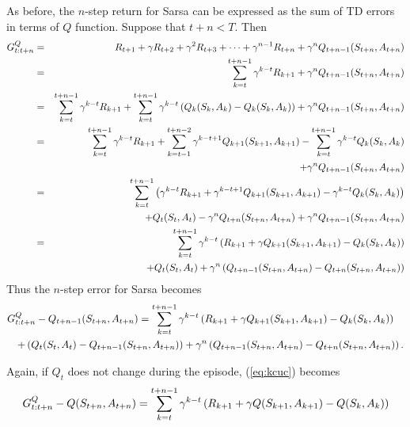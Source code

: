 As before, the $n$-step return for Sarsa can be expressed as the sum of TD errors in terms of $Q$ function.
Suppose that $t+n<T$. Then
\begin{eqnarray*}
G^{Q}_{{t}:{t+n}}
&=&
R_{t+1} + \gamma R_{t+2} + \gamma^2 R_{t+3} + \cdots + \gamma^{n-1} R_{t+n} + \gamma^n Q_{t+n-1}(S_{t+n}, A_{t+n})
\\
&=&
\sum_{k=t}^{t+n-1} \gamma^{k-t} R_{k+1} + \gamma^n Q_{t+n-1}(S_{t+n}, A_{t+n})
\\
&=&
\sum_{k=t}^{t+n-1} \gamma^{k-t} R_{k+1}
+ \sum_{k=t}^{t+n-1} \gamma^{k-t} \left( Q_{k}(S_{k},A_{k}) - Q_{k}(S_{k},A_{k}) \right)
+ \gamma^n Q_{t+n-1}(S_{t+n}, A_{t+n})
\\
&=&
\sum_{k=t}^{t+n-1} \gamma^{k-t} R_{k+1}
+ \sum_{k=t-1}^{t+n-2} \gamma^{k-t+1} Q_{k+1}(S_{k+1},A_{k+1})
- \sum_{k=t}^{t+n-1} \gamma^{k-t} Q_{k}(S_{k},A_{k})
\\
&&+ \gamma^n Q_{t+n-1}(S_{t+n}, A_{t+n})
\\
&=&
\sum_{k=t}^{t+n-1} \left( \gamma^{k-t} R_{k+1} + \gamma^{k-t+1} Q_{k+1}(S_{k+1},A_{k+1}) - \gamma^{k-t} Q_{k}(S_{k},A_{k}) \right)
\\
&&
+ Q_{t}(S_{t},A_{t}) - \gamma^{n}Q_{t+n}(S_{t+n}, A_{t+n}) + \gamma^n Q_{t+n-1}(S_{t+n}, A_{t+n})
\\
&=&
\sum_{k=t}^{t+n-1} \gamma^{k-t} \left( R_{k+1} + \gamma Q_{k+1}(S_{k+1},A_{k+1}) - Q_{k}(S_{k},A_{k}) \right)
\\
&&
+ Q_{t}(S_{t},A_{t}) + \gamma^n \left( Q_{t+n-1}(S_{t+n}, A_{t+n}) - Q_{t+n}(S_{t+n}, A_{t+n}) \right)
\end{eqnarray*}
Thus the $n$-step error for Sarsa becomes
\begin{eqnarray}
\nonumber
\lefteqn{
\nstepqreturn{t}{t+n} - Q_{t+n-1}(\state{t+n},\action{t+n})
= 
\sum_{k=t}^{t+n-1} \df^{k-t} \left( \reward{k+1} + \df Q_{k+1}(\state{k+1},\action{k+1}) - Q_{k}(\state{k},\action{k}) \right)
}
\\
&&
+ \left( Q_{t}(\state{t},\action{t}) - Q_{t+n-1}(\state{t+n},\action{t+n}) \right)
+ \df^n \left( Q_{t+n-1}(\state{t+n}, \action{t+n}) - Q_{t+n}(\state{t+n}, \action{t+n}) \right).
\label{eq:kcuc}
\end{eqnarray}

Again, if $Q_{t}$ does not change during the episode, (\ref{eq:kcuc}) becomes
\begin{equation}
G^{Q}_{{t}:{t+n}} - Q(S_{t+n},A_{t+n})
= 
\sum_{k=t}^{t+n-1} \gamma^{k-t} \left( R_{k+1} + \gamma Q(S_{k+1},A_{k+1}) - Q(S_{k},A_{k}) \right)
\end{equation}




